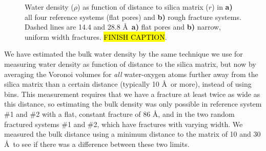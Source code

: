 \begin{figure}[htpb]%
\setlength{\myfigwidth}{0.58\textwidth}%
\makebox[\textwidth][c]{ %
    \begin{minipage}[t]{\myfigwidth}%
        \centering%
        \subcaption{\label{fig:density_reference_systems}}%
    \end{minipage}%
    \hfill%
    \begin{minipage}[t]{\myfigwidth}%
        \centering%
        \subcaption{\label{fig:density_rough_systems}}%
    \end{minipage}%
}%
\caption{%
    Water density ($\rho$) as function of distance to silica matrix ($r$) in \textbf{a)} all four reference systems (flat pores) and \textbf{b)} rough fracture systems. Dashed lines are 14.4 and 28.8 \AA\ \textbf{a)} flat pores and \textbf{b)} narrow, uniform width fractures.\label{fig:first_density_fig} \hl{FINISH CAPTION}.%
}%
\end{figure}%

We have estimated the bulk water density by the same technique we use for measuring water density as function of distance to the silica matrix, but now by averaging the Voronoi volumes for \emph{all} water-oxygen atoms further away from the silica matrix than a certain distance (typically 10 \AA\ or more), instead of using bins. This measurement requires that we have a fracture at least twice as wide as this distance, so estimating the bulk density was only possible in reference system \#1 and \#2 with a flat, constant fracture of 86 \AA, and in the two random fractured systems \#1 and \#2, which have fractures with varying width. We measured the bulk distance using a minimum distance to the matrix of 10 and 30 \AA\, to see if there was a difference between these two limits.

